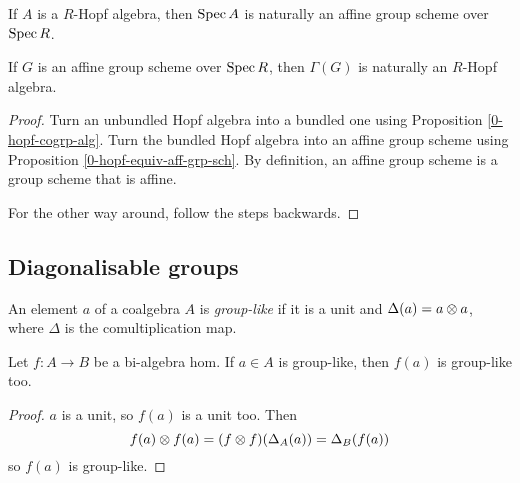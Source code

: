\begin{theorem}
  \label{0-hopf-aff-grp-sch}
  \uses{}
  \leanok

  If $A$ is a $R$-Hopf algebra, then $\operatorname{Spec} A$ is naturally an affine group scheme over $\operatorname{Spec} R$.

  If $G$ is an affine group scheme over $\operatorname{Spec} R$, then $\Gamma(G)$ is naturally an $R$-Hopf algebra.
\end{theorem}
\begin{proof}

  Turn an unbundled Hopf algebra into a bundled one using Proposition \ref{0-hopf-cogrp-alg}. Turn
  the bundled Hopf algebra into an affine group scheme using Proposition \ref{0-hopf-equiv-aff-grp-sch}. By definition, an affine group scheme is a group scheme that is affine.

  For the other way around, follow the steps backwards.
\end{proof}


\subsection{Diagonalisable groups}


\begin{definition}
  \label{0-grp-like}
  \uses{}
  \leanok

  An element $a$ of a coalgebra $A$ is \emph{group-like} if it is a unit and $\Delta(a) = a \otimes a$, where $\Delta$ is the comultiplication map.
\end{definition}


\begin{lemma}
  \label{0-grp-like-map}
  \leanok

  Let $f : A \to B$ be a bi-algebra hom. If $a \in A$ is group-like, then $f(a)$ is group-like too.
\end{lemma}
\begin{proof}
  \uses{}
  \leanok

  $a$ is a unit, so $f(a)$ is a unit too. Then
  \[
    f(a) \otimes f(a) = (f \otimes f)(\Delta_A(a)) = \Delta_B(f(a))
  \]
  so $f(a)$ is group-like.
\end{proof}


